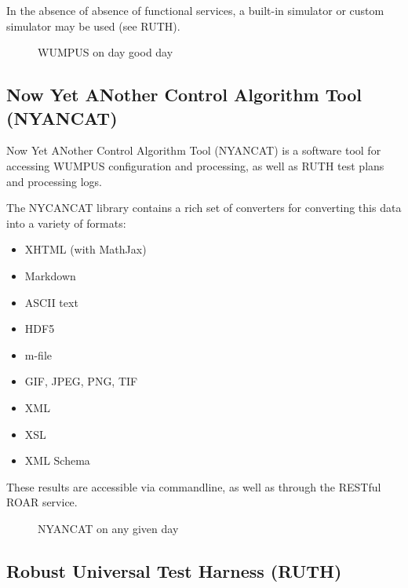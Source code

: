 \documentclass{article}[11pt]
\begin{document}
\par 
In the absence of absence of functional services, a built-in simulator or custom simulator may be used (see RUTH).

\begin{figure}[h]
\begin{center}
\end{center}
\caption{WUMPUS on day good day}
\label{fig:wumpus}
\end{figure}

\subsection{Now Yet ANother Control Algorithm Tool (NYANCAT)}

\par Now Yet ANother Control Algorithm Tool (NYANCAT) is a software tool for accessing WUMPUS configuration and processing, as well as RUTH test plans and processing logs.

\par The NYCANCAT library contains a rich set of converters for converting this data into a variety of formats:
\begin{itemize}
  \item XHTML (with MathJax)
  \item Markdown
  \item ASCII text
  \item HDF5
  \item m-file
  \item GIF, JPEG, PNG, TIF
  \item XML
  \item XSL
  \item XML Schema
\end{itemize}

\par These results are accessible via commandline, as well as through the RESTful ROAR service.

\begin{figure}[h]
\begin{center}
\end{center}
\caption{NYANCAT on any given day}
\label{fig:nyancat}
\end{figure}

\subsection{Robust Universal Test Harness (RUTH)}
\end{document}
